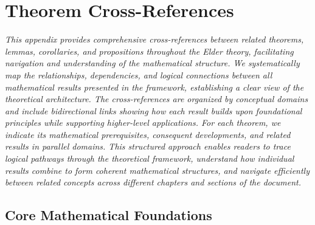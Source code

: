 \chapter{Theorem Cross-References}

\textit{This appendix provides comprehensive cross-references between related theorems, lemmas, corollaries, and propositions throughout the Elder theory, facilitating navigation and understanding of the mathematical structure. We systematically map the relationships, dependencies, and logical connections between all mathematical results presented in the framework, establishing a clear view of the theoretical architecture. The cross-references are organized by conceptual domains and include bidirectional links showing how each result builds upon foundational principles while supporting higher-level applications. For each theorem, we indicate its mathematical prerequisites, consequent developments, and related results in parallel domains. This structured approach enables readers to trace logical pathways through the theoretical framework, understand how individual results combine to form coherent mathematical structures, and navigate efficiently between related concepts across different chapters and sections of the document.}

\section{Core Mathematical Foundations}

